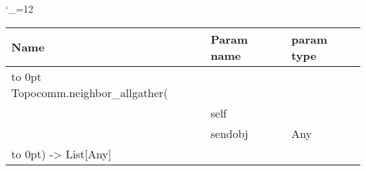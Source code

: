 \begingroup \catcode`\_=12 \tt
\begin{tabular}{lll}
\toprule
\textrm{Name}&\textrm{Param name}&\textrm{param type}\\
\midrule
\hbox to 0pt {Topocomm.neighbor_allgather(\hss}\\
& self\\
& sendobj & Any\\
\hbox to 0pt{) -> List[Any]\hss}\\
\bottomrule
\end{tabular}
\endgroup
